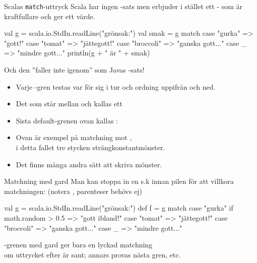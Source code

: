 \begin{Slide}{Scalas \texttt{match}-uttryck}\SlideFontSmall
Scala har ingen -sats men erbjuder i stället ett - som är kraftfullare och ger ett värde.

\begin{Code}
val g = scala.io.StdIn.readLine("grönsak:")
val smak = g match {
  case "gurka" => "gott!"
  case "tomat" => "jättegott!"
  case "broccoli" => "ganska gott..."
  case _ => "mindre gott..."
}
println(g + " är " + smak)
\end{Code}
Och den ''faller inte igenom'' som Javas -sats!
\begin{itemize}
\pause\item Varje -gren testas var för sig i tur och ordning uppifrån och ned.
\pause\item Det som står mellan  och \code{=>} kallas ett  
\pause\item Sista default-grenen ovan kallas : 
\pause\item Ovan är exempel på matchning mot , \\ i detta fallet tre stycken strängkonstantmönster.
\pause\item Det finns många andra sätt att skriva mönster.
\end{itemize}
\end{Slide}



\begin{Slide}{Matchning med gard}
Man kan stoppa in en s.k   innan pilen \code{=>} för att villkora matchningen: (notera , parenteser behövs ej)
\begin{Code}
val g = scala.io.StdIn.readLine("grönsak:")
def f = g match {
  case "gurka" if math.random > 0.5 => "gott ibland!"
  case "tomat" => "jättegott!"
  case "broccoli" => "ganska gott..."
  case _ => "mindre gott..."
}
\end{Code}
-grenen med gard ger bara en lyckad matchning \\ om uttrycket efter  är sant; annars provas nästa gren, etc.
\end{Slide}


